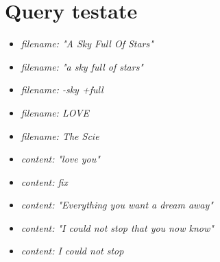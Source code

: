 \documentclass{article}
\begin{document}
\section{Query testate}
\begin{itemize}
    \item \textit{filename: "A Sky Full Of Stars"}
    \item \textit{filename: "a sky full of stars"}
    \item \textit{filename: -sky +full}
    \item \textit{filename: LOVE}
    \item \textit{filename: The Scie}
    \item \textit{content: "love you"}
    \item \textit{content: fix}
    \item \textit{content: "Everything you want a dream away"}
    \item \textit{content: "I could not stop that you now know"}
    \item \textit{content: I could not stop}
\end{itemize}
\end{document}
